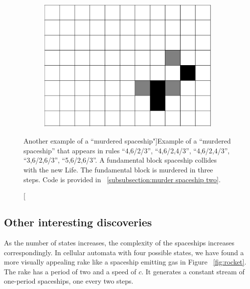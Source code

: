 \documentclass[12pt]{article}
\numberwithin{figure}{section} %
\begin{document}
\begin{figure}[H]
\begin{subfigure}{0.24\textwidth}
     		\subcaption{}
   	\end{subfigure}
        	\begin{subfigure}{0.24\textwidth}
     		\centering
     		\includegraphics[width=\linewidth]{Section4/33.7}
     		\subcaption{}
   	\end{subfigure}
   	\caption[Another example of a “murdered spaceship"]{Example of a “murdered spaceship” that appears in rules “4,6/2/3”, “4,6/2,4/3”, “4,6/2,4/3”, “3,6/2,6/3”, “5,6/2,6/3”. A fundamental block spaceship collides with the new Life. The fundamental block is murdered in three steps. Code is provided in ~\ref{subsubsection:murder spaceship two}. }
   	\label{fig:murder spaceship two}
	\vspace{-1.5em}
\end{figure}
\subsection{Other interesting discoveries}
As the number of states increases, the complexity of the spaceships increases correspondingly. In cellular automata with four possible states, we have found a more visually appealing rake like a spaceship emitting gas in Figure ~\ref{fig:rocket}. The rake has a period of two and a speed of $c$. It generates a constant stream of one-period spaceships, one every two steps. 
\end{document}
